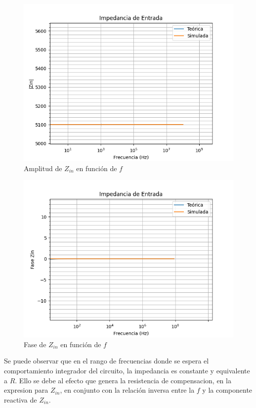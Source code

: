 \begin{figure}[H]
    \centering 
    \includegraphics [scale=0.6] {../Ejercicio3-CircuitoIntegradoresyDerivadores/Imagenes/zin-compensado-amplitud.png} 
    \caption{Amplitud de $Z_{in}$ en función de $f$}
    \label{fig:emptyPlotTool}
\end{figure}

\begin{figure}[H]
    \centering 
    \includegraphics [scale=0.6] {../Ejercicio3-CircuitoIntegradoresyDerivadores/Imagenes/zin-compensado-fase.png} 
    \caption{Fase de $Z_{in}$ en función de $f$ }
    \label{fig:emptyPlotTool}
\end{figure}

Se puede observar que en el rango de frecuencias donde se espera el comportamiento integrador del circuito, la impedancia es constante
y equivalente a $R$. Ello se debe al efecto que genera la resistencia de compensacion, en la expresion para $Z_{in}$, en conjunto con 
la relación inversa entre la $f$ y la componente reactiva de $Z_{in}$.


